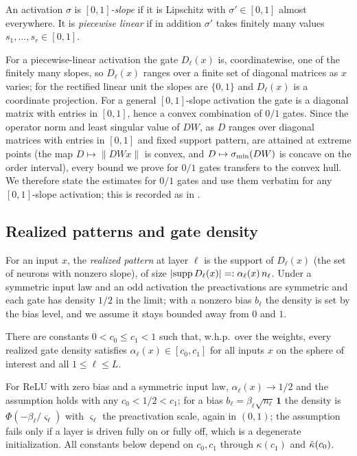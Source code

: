\begin{definition}\label{def:gate}
An activation $\sigma$ is \emph{$[0,1]$-slope} if it is Lipschitz with $\sigma'\in[0,1]$ almost
everywhere. It is \emph{piecewise linear} if in addition $\sigma'$ takes finitely many values
$s_1,\dots,s_r\in[0,1]$.
\end{definition}

For a piecewise-linear activation the gate $D_\ell(x)$ is, coordinatewise, one of the finitely many
slopes, so $D_\ell(x)$ ranges over a finite set of diagonal matrices as $x$ varies; for the rectified
linear unit the slopes are $\{0,1\}$ and $D_\ell(x)$ is a coordinate projection. For a general
$[0,1]$-slope activation the gate is a diagonal matrix with entries in $[0,1]$, hence a convex
combination of $0/1$ gates. Since the operator norm and least singular value of $DW$, as $D$ ranges
over diagonal matrices with entries in $[0,1]$ and fixed support pattern, are attained at extreme
points (the map $D\mapsto\|DWx\|$ is convex, and $D\mapsto\sigma_{\min}(DW)$ is concave on the order interval),
every bound we prove for $0/1$ gates transfers to the convex hull. We therefore state the estimates
for $0/1$ gates and use them verbatim for any $[0,1]$-slope activation; this is recorded as
 in .

\subsection{Realized patterns and gate density}
For an input $x$, the \emph{realized pattern} at layer $\ell$ is the support of $D_\ell(x)$ (the set of
neurons with nonzero slope), of size $|{\operatorname{supp} D_\ell(x)}|=:\alpha_\ell(x)\,n_\ell$. Under a symmetric
input law and an odd activation the preactivations are symmetric and each gate has density $1/2$ in
the limit; with a nonzero bias $b_\ell$ the density is set by the bias level, and we assume it stays
bounded away from $0$ and $1$.

\begin{assumption}\label{ass:nondeg}
There are constants $0<c_0\le c_1<1$ such that, w.h.p.\ over the weights, every realized gate density
satisfies $\alpha_\ell(x)\in[c_0,c_1]$ for all inputs $x$ on the sphere of interest and all
$1\le\ell\le L$.
\end{assumption}

For ReLU with zero bias and a symmetric input law, $\alpha_\ell(x)\to1/2$ and the assumption holds
with any $c_0<1/2<c_1$; for a bias $b_\ell=\beta_\ell\sqrt{n_\ell}\,\mathbf 1$ the density is
$\Phi(-\beta_\ell/\varsigma_\ell)$ with $\varsigma_\ell$ the preactivation scale, again in $(0,1)$; the
assumption fails only if a layer is driven fully on or fully off, which is a degenerate initialization.
All constants below depend on $c_0,c_1$ through $\kappa(c_1)$ and $\check{\kappa}(c_0)$.

